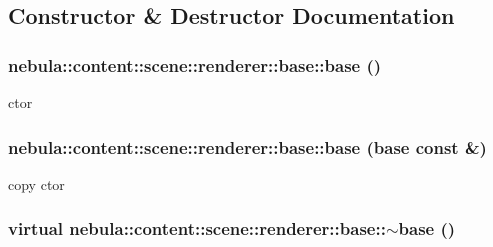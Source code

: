 \subsection{Constructor \& Destructor Documentation}
\hypertarget{classnebula_1_1content_1_1scene_1_1renderer_1_1base_a789a397ad7a9964cfe33f8cbbc2583e2}{
\subsubsection[{base}]{\setlength{\rightskip}{0pt plus 5cm}nebula::content::scene::renderer::base::base ()}}
\label{classnebula_1_1content_1_1scene_1_1renderer_1_1base_a789a397ad7a9964cfe33f8cbbc2583e2}


ctor \hypertarget{classnebula_1_1content_1_1scene_1_1renderer_1_1base_a1cb15c1d5b1016581fc481590ec1dc72}{
\subsubsection[{base}]{\setlength{\rightskip}{0pt plus 5cm}nebula::content::scene::renderer::base::base ({\bf base} const \&)}}
\label{classnebula_1_1content_1_1scene_1_1renderer_1_1base_a1cb15c1d5b1016581fc481590ec1dc72}


copy ctor \hypertarget{classnebula_1_1content_1_1scene_1_1renderer_1_1base_aefd8d338eb039f83ec80dfb0332cdf9f}{
\subsubsection[{$\sim$base}]{\setlength{\rightskip}{0pt plus 5cm}virtual nebula::content::scene::renderer::base::$\sim$base ()}}
\label{classnebula_1_1content_1_1scene_1_1renderer_1_1base_aefd8d338eb039f83ec80dfb0332cdf9f}


